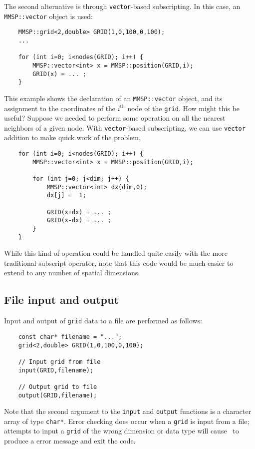 The second alternative is through {\tt vector}-based subscripting.  In this case, an {\tt MMSP::vector} object is used:
\begin{shadebox}
\begin{verbatim}
    MMSP::grid<2,double> GRID(1,0,100,0,100);
    ...

    for (int i=0; i<nodes(GRID); i++) {
        MMSP::vector<int> x = MMSP::position(GRID,i);
        GRID(x) = ... ;
    }
\end{verbatim}
\end{shadebox}
This example shows the declaration of an {\tt MMSP::vector} object, and its assignment to the coordinates of the $i^\text{th}$ node of the {\tt grid}.  How might this be useful?  Suppose we needed to perform some operation on all the nearest neighbors of a given node.  With {\tt vector}-based subscripting, we can use {\tt vector} addition to make quick work of the problem,
\begin{shadebox}
\begin{verbatim}
    for (int i=0; i<nodes(GRID); i++) {
        MMSP::vector<int> x = MMSP::position(GRID,i);

        for (int j=0; j<dim; j++) {
            MMSP::vector<int> dx(dim,0);
            dx[j] =  1;

            GRID(x+dx) = ... ;
            GRID(x-dx) = ... ;
        }
    }
\end{verbatim}
\end{shadebox}
While this kind of operation could be handled quite easily with the more traditional subscript operator, note that this code would be much easier to extend to any number of spatial dimensions.

\subsection{File input and output}
Input and output of {\tt grid} data to a file are performed as follows:
\begin{shadebox}
\begin{verbatim}
    const char* filename = "...";
    grid<2,double> GRID(1,0,100,0,100);

    // Input grid from file
    input(GRID,filename);

    // Output grid to file
    output(GRID,filename);
\end{verbatim}
\end{shadebox}
Note that the second argument to the {\tt input} and {\tt output} functions is a character array of type {\tt char*}.  Error checking does occur when a {\tt grid} is input from a file; attempts to input a {\tt grid} of the wrong dimension or data type will cause \MMSP\ to produce a error message and exit the code.

